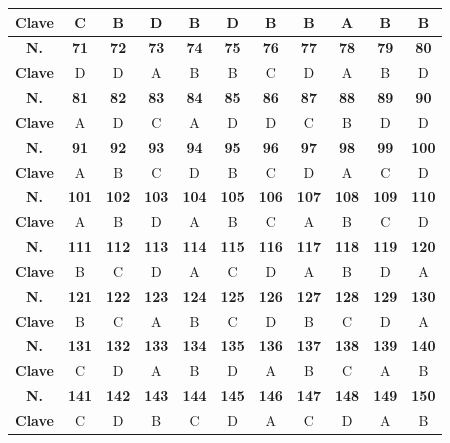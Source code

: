 \begin{center}
\begin{tabular}{|c|c|c|c|c|c|c|c|c|c|c|}
\hline
\textbf{Clave} & C & B & D & B & D & B & B & A & B & B \\
\hline
\textbf{N.} & \textbf{71} & \textbf{72} & \textbf{73} & \textbf{74} & \textbf{75} & \textbf{76} & \textbf{77} & \textbf{78} & \textbf{79} & \textbf{80} \\
\hline
\textbf{Clave} & D & D & A & B & B & C & D & A & B & D \\
\hline
\textbf{N.} & \textbf{81} & \textbf{82} & \textbf{83} & \textbf{84} & \textbf{85} & \textbf{86} & \textbf{87} & \textbf{88} & \textbf{89} & \textbf{90} \\
\hline
\textbf{Clave} & A & D & C & A & D & D & C & B & D & D \\
\hline
\textbf{N.} & \textbf{91} & \textbf{92} & \textbf{93} & \textbf{94} & \textbf{95} & \textbf{96} & \textbf{97} & \textbf{98} & \textbf{99} & \textbf{100} \\
\hline
\textbf{Clave} & A & B & C & D & B & C & D & A & C & D \\
\hline
\textbf{N.} & \textbf{101} & \textbf{102} & \textbf{103} & \textbf{104} & \textbf{105} & \textbf{106} & \textbf{107} & \textbf{108} & \textbf{109} & \textbf{110} \\
\hline
\textbf{Clave} & A & B & D & A & B & C & A & B & C & D \\
\hline
\textbf{N.} & \textbf{111} & \textbf{112} & \textbf{113} & \textbf{114} & \textbf{115} & \textbf{116} & \textbf{117} & \textbf{118} & \textbf{119} & \textbf{120} \\
\hline
\textbf{Clave} & B & C & D & A & C & D & A & B & D & A \\
\hline
\textbf{N.} & \textbf{121} & \textbf{122} & \textbf{123} & \textbf{124} & \textbf{125} & \textbf{126} & \textbf{127} & \textbf{128} & \textbf{129} & \textbf{130} \\
\hline
\textbf{Clave} & B & C & A & B & C & D & B & C & D & A \\
\hline
\textbf{N.} & \textbf{131} & \textbf{132} & \textbf{133} & \textbf{134} & \textbf{135} & \textbf{136} & \textbf{137} & \textbf{138} & \textbf{139} & \textbf{140} \\
\hline
\textbf{Clave} & C & D & A & B & D & A & B & C & A & B \\
\hline
\textbf{N.} & \textbf{141} & \textbf{142} & \textbf{143} & \textbf{144} & \textbf{145} & \textbf{146} & \textbf{147} & \textbf{148} & \textbf{149} & \textbf{150} \\
\hline
\textbf{Clave} & C & D & B & C & D & A & C & D & A & B \\

\end{tabular}
\end{center}
